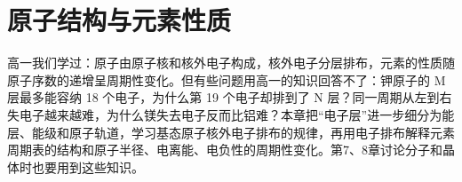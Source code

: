 \newcommand{\csixlev}[4]{\foreach \csixk in {1,...,#3}{\draw[c6box] ({#1+\csixk-1},#2) rectangle ++(1,1);}%
  \node[font=\scriptsize,below] at ({#1+#3/2},#2) {#4};}
\newcommand{\csixlv}[4]{\foreach \csixk in {1,...,#3}{\draw[c6box] ({#1+(\csixk-1)*0.24},#2) rectangle ++(0.24,0.48);}%
  \node[left,font=\scriptsize,inner sep=1.5pt] at (#1,#2+0.24) {#4};}
\newcommand{\csixlobe}[2]{\shade[ball color=mainblue!55,rotate=#1,xscale=#2]
  (0,0) .. controls (0.22,0.46) and (0.98,0.56) .. (1.05,0) .. controls (0.98,-0.56) and (0.22,-0.46) .. (0,0);}
\newcommand{\csixaxes}{\draw[c6ax] (0,-1.25)--(0,1.4) node[above,font=\scriptsize]{$z$};
  \draw[c6ax] (-1.25,0)--(1.4,0) node[right,font=\scriptsize]{$y$};
  \draw[c6ax] (0.72,0.58)--(-0.9,-0.72) node[below left,font=\scriptsize,inner sep=1pt]{$x$};}
\newcommand{\csixcell}[3]{\draw[#3,draw=black!45,line width=0.3pt] (#1-1,-#2) rectangle ++(1,1);}
\newcommand{\csixsame}{\begin{tikzpicture}[baseline={(0,-0.12)},x=0.46cm,y=0.46cm,line width=0.5pt]
  \draw (0,-0.5) rectangle ++(1,1);
  \draw[-{Stealth[length=1.1mm]}] (0.33,-0.35)--(0.33,0.38);
  \draw[-{Stealth[length=1.1mm]}] (0.67,-0.35)--(0.67,0.38);\end{tikzpicture}}

\chapter{原子结构与元素性质}

高一我们学过：原子由原子核和核外电子构成，核外电子分层排布，元素的性质随原子序数的递增呈周期性变化。但有些问题用高一的知识回答不了：钾原子的 M 层最多能容纳 18 个电子，为什么第 19 个电子却排到了 N 层？同一周期从左到右失电子越来越难，为什么镁失去电子反而比铝难？本章把“电子层”进一步细分为能层、能级和原子轨道，学习基态原子核外电子排布的规律，再用电子排布解释元素周期表的结构和原子半径、电离能、电负性的周期性变化。第7、8章讨论分子和晶体时也要用到这些知识。

